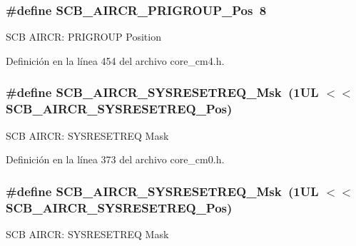 \subsubsection[{\texorpdfstring{S\+C\+B\+\_\+\+A\+I\+R\+C\+R\+\_\+\+P\+R\+I\+G\+R\+O\+U\+P\+\_\+\+Pos}{SCB_AIRCR_PRIGROUP_Pos}}]{\setlength{\rightskip}{0pt plus 5cm}\#define S\+C\+B\+\_\+\+A\+I\+R\+C\+R\+\_\+\+P\+R\+I\+G\+R\+O\+U\+P\+\_\+\+Pos~8}\hypertarget{group___c_m_s_i_s___s_c_b_gaca155deccdeca0f2c76b8100d24196c8}{}\label{group___c_m_s_i_s___s_c_b_gaca155deccdeca0f2c76b8100d24196c8}
S\+CB A\+I\+R\+CR\+: P\+R\+I\+G\+R\+O\+UP Position 

Definición en la línea 454 del archivo core\+\_\+cm4.\+h.

\subsubsection[{\texorpdfstring{S\+C\+B\+\_\+\+A\+I\+R\+C\+R\+\_\+\+S\+Y\+S\+R\+E\+S\+E\+T\+R\+E\+Q\+\_\+\+Msk}{SCB_AIRCR_SYSRESETREQ_Msk}}]{\setlength{\rightskip}{0pt plus 5cm}\#define S\+C\+B\+\_\+\+A\+I\+R\+C\+R\+\_\+\+S\+Y\+S\+R\+E\+S\+E\+T\+R\+E\+Q\+\_\+\+Msk~(1\+U\+L $<$$<$ S\+C\+B\+\_\+\+A\+I\+R\+C\+R\+\_\+\+S\+Y\+S\+R\+E\+S\+E\+T\+R\+E\+Q\+\_\+\+Pos)}\hypertarget{group___c_m_s_i_s___s_c_b_gaae1181119559a5bd36e62afa373fa720}{}\label{group___c_m_s_i_s___s_c_b_gaae1181119559a5bd36e62afa373fa720}
S\+CB A\+I\+R\+CR\+: S\+Y\+S\+R\+E\+S\+E\+T\+R\+EQ Mask 

Definición en la línea 373 del archivo core\+\_\+cm0.\+h.

\subsubsection[{\texorpdfstring{S\+C\+B\+\_\+\+A\+I\+R\+C\+R\+\_\+\+S\+Y\+S\+R\+E\+S\+E\+T\+R\+E\+Q\+\_\+\+Msk}{SCB_AIRCR_SYSRESETREQ_Msk}}]{\setlength{\rightskip}{0pt plus 5cm}\#define S\+C\+B\+\_\+\+A\+I\+R\+C\+R\+\_\+\+S\+Y\+S\+R\+E\+S\+E\+T\+R\+E\+Q\+\_\+\+Msk~(1\+U\+L $<$$<$ S\+C\+B\+\_\+\+A\+I\+R\+C\+R\+\_\+\+S\+Y\+S\+R\+E\+S\+E\+T\+R\+E\+Q\+\_\+\+Pos)}\hypertarget{group___c_m_s_i_s___s_c_b_gaae1181119559a5bd36e62afa373fa720}{}\label{group___c_m_s_i_s___s_c_b_gaae1181119559a5bd36e62afa373fa720}
S\+CB A\+I\+R\+CR\+: S\+Y\+S\+R\+E\+S\+E\+T\+R\+EQ Mask 

